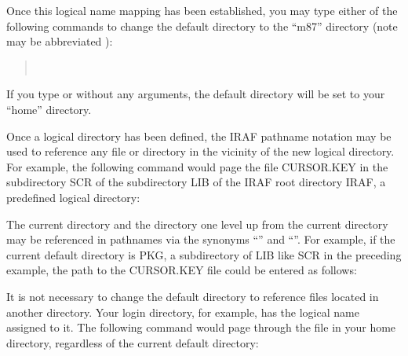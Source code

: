 \noindent
Once this logical name mapping has been established, you may type either
of the following commands to change the default
directory to the ``m87'' directory (note  may be
abbreviated ):

\begin{quotation}\noindent
{}  \\
\medskip
{} \footnotemark
\end{quotation}

\footnotetext{ {\bf VMS :} The characters \comptype{\$} and \comptype{[},
commonly used in VMS device and directory names, will cause a conflict
if VMS file or device names using them are passed to IRAF tasks since these
characters have a special meaning in IRAF filenames and filename templates.
If either of these characters is used in a VMS filename passed to an IRAF
program, the character must be escaped to avoid interpretation as a VOS
metacharacter, e.g., \comptype{page usr\bsl\$0:\bsl[iraf.local]login.cl}.}

\noindent
If you type  or  without any arguments, the
default directory will be set to your ``home'' directory.

Once a logical directory has been defined, the IRAF pathname notation may
be used to reference any file or directory in the vicinity of the new logical
directory.  For example, the following command would page the file CURSOR.KEY
in the subdirectory SCR of the subdirectory LIB of the IRAF root directory
IRAF, a predefined logical directory:

\begin{quotation}\noindent
{} 
\end{quotation}

The current directory and the directory one level up from the current
directory may be referenced in pathnames via the synonyms ``''
and ``''.  For example, if the current default directory is PKG,
a subdirectory of LIB like SCR in the preceding example, the path to the
CURSOR.KEY file could be entered as follows:

\begin{quotation}\noindent
{} 
\end{quotation}

It is not necessary to change the default directory to reference
files located in another directory. Your login directory, for example, has
the logical name  assigned to it.  
The following command would page through the  
file in your home directory, regardless of the current default directory:

